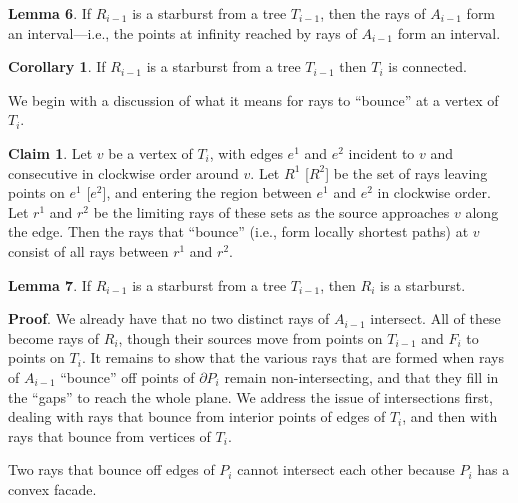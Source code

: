 \documentclass[a4paper]{article}
\begin{document}
\textbf{Lemma 6}. If \(R_{i - 1}\) is a starburst from a tree \(T_{i - 1}\), then the rays of \(A_{i - 1}\) form an interval—i.e., the points at infinity reached by rays of \(A_{i - 1}\) form an interval.

\textbf{Corollary 1}. If \(R_{i - 1}\) is a starburst from a tree \(T_{i - 1}\) then \(T_i\) is connected. 

We begin with a discussion of what it means for rays to “bounce” at a vertex of \(T_i\). 

\textbf{Claim 1}. Let \(v\) be a vertex of \(T_i\), with edges \(e^1\) and \(e^2\) incident to \(v\) and consecutive in clockwise order around \(v\). Let \(R^1\) [\(R^2\)] be the set of rays leaving points on \(e^1\) [\(e^2\)], and entering the region between \(e^1\) and \(e^2\) in clockwise order. Let \(r^1\) and \(r^2\) be the limiting rays of these sets as the source approaches \(v\) along the edge. Then the rays that “bounce” (i.e., form locally shortest paths) at \(v\) consist of all rays between \(r^1\) and \(r^2\).

\textbf{Lemma 7}. If \(R_{i - 1}\) is a starburst from a tree \(T_{i - 1}\), then \(R_i\) is a starburst.

\textbf{Proof}. We already have that no two distinct rays of \(A_{i - 1}\) intersect. All of these become rays of \(R_i\), though their sources move from points on \(T_{i - 1}\) and \(F_i\) to points on \(T_i\). It remains to show that the various rays that are formed when rays of \(A_{i - 1}\) “bounce” oﬀ points of \(\partial P_i\) remain non-intersecting, and that they fill in the “gaps” to reach the whole plane. We address the issue of intersections first, dealing with rays that bounce from interior points of edges of \(T_i\), and then with rays that bounce from vertices of \(T_i\).

Two rays that bounce off edges of \(P_i\) cannot intersect each other because \(P_i\) has a convex facade. 
\end{document}
